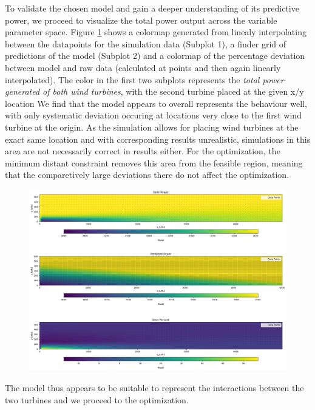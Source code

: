 To validate the chosen model and gain a deeper understanding of its predictive power, we proceed to visualize the total power output across the variable parameter space. Figure \ref{fig:determ_model_colormap} shows a colormap generated from linealy interpolating between the datapoints for the simulation data (Subplot 1), a finder grid of predictions of the model (Subplot 2) and a colormap of the percentage deviation between model and raw data (calculated at points and then again linearly interpolated). The color in the first two subplots represents the \textit{total power generated of both wind turbines}, with the second turbine placed at the given x/y location We find that the model appears to overall represents the behaviour well, with only systematic deviation occuring at locations very close to the first wind turbine at the origin. As the simulation allows for placing wind turbines at the exact same location and with corresponding results unrealistic, simulations in this area are not necessarily correct in results either. For the optimization, the minimum distant constraint removes this area from the feasible region, meaning that the comparetively large deviations there do not affect the optimization. 

\begin{figure}[h] 
	\centering
	\includegraphics[width=1\textwidth]{figures/optimization/determ_model_colormap.png} 
	\caption{}
	\label{fig:determ_model_colormap}
\end{figure}

The model thus appears to be suitable to represent the interactions between the two turbines and we proceed to the optimization.

